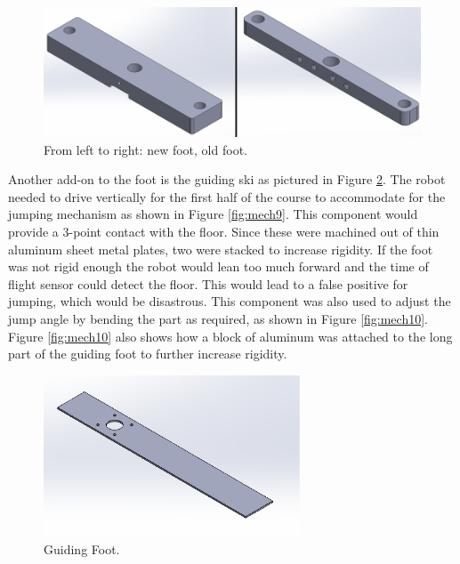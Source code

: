 \documentclass[ece]{uw-wkrpt}
\begin{document}
\begin{figure}
    \centering
    \includegraphics[width=5.5in]{res/mech7}
    \caption[Comparison of changes in mechanical design of foot]
          {From left to right: new foot, old foot.}
    \label{fig:mech7}
\end{figure}

Another add-on to the foot is the guiding ski as pictured in Figure \ref{fig:mech8}. The robot needed to drive vertically for the first half of the course to accommodate for the jumping mechanism as shown in Figure \ref{fig:mech9}. This component would provide a 3-point contact with the floor. Since these were machined out of thin aluminum sheet metal plates, two were stacked to increase rigidity. If the foot was not rigid enough the robot would lean too much forward and the time of flight sensor could detect the floor. This would lead to a false positive for jumping, which would be disastrous. This component was also used to adjust the jump angle by bending the part as required, as shown in Figure \ref{fig:mech10}. Figure \ref{fig:mech10} also shows how a block of aluminum was attached to the long part of the guiding foot to further increase rigidity. 

\begin{figure}
    \centering
    \includegraphics[width=3.0in]{res/mech8}
    \caption[Guiding foot]
          {Guiding Foot.}
    \label{fig:mech8}
\end{figure}
\end{document}
